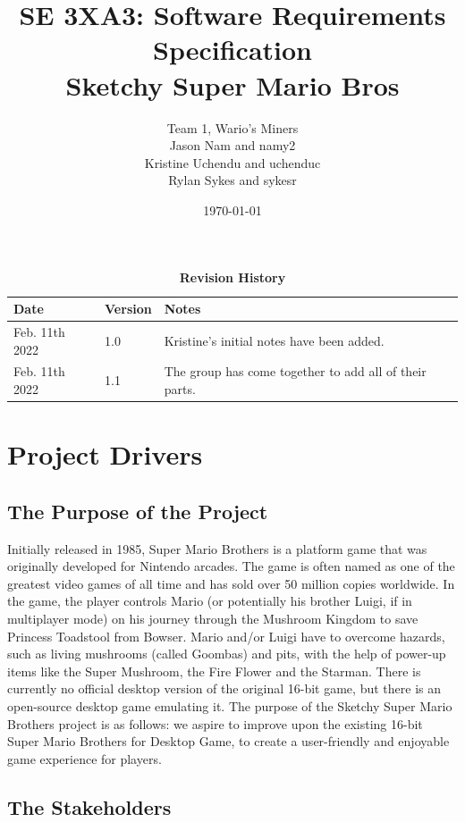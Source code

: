 \documentclass[12pt, titlepage]{article}
\title{SE 3XA3: Software Requirements Specification\\Sketchy Super Mario Bros}
\author{Team 1, Wario's Miners
		\\ Jason Nam and namy2
		\\ Kristine Uchendu and uchenduc
		\\ Rylan Sykes and sykesr
}
\date{\today}
\begin{document}
\maketitle

\tableofcontents
\listoftables
\listoffigures

\begin{table}[bp]
\caption{\bf Revision History}
\begin{tabularx}{\textwidth}{p{3cm}p{2cm}X}
\toprule {\bf Date} & {\bf Version} & {\bf Notes}\\
\midrule
Feb. 11th 2022 & 1.0 & Kristine's initial notes have been added.\\
Feb. 11th 2022 & 1.1 & The group has come together to add all of their parts.\\
\bottomrule
\end{tabularx}
\end{table}

\newpage


\section{Project Drivers}

\subsection{The Purpose of the Project}
Initially released in 1985, Super Mario Brothers is a platform game that was originally developed for Nintendo arcades. The game is often named as one of the greatest video games of all time and has sold over 50 million copies worldwide. In the game, the player controls Mario (or potentially his brother Luigi, if in multiplayer mode) on his journey through the Mushroom Kingdom to save Princess Toadstool from Bowser. Mario and/or Luigi have to overcome hazards, such as living mushrooms (called Goombas) and pits, with the help of power-up items like the Super Mushroom, the Fire Flower and the Starman. There is currently no official desktop version of the original 16-bit game, but there is an open-source desktop game emulating it. The purpose of the Sketchy Super Mario Brothers project is as follows: we aspire to improve upon the existing 16-bit Super Mario Brothers for Desktop Game, to create a user-friendly and enjoyable game experience for players.

\subsection{The Stakeholders}
\end{document}
